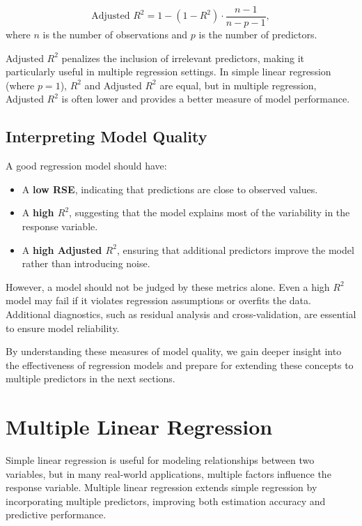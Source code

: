 \documentclass[
  11pt,
]{book}
\providecommand{\tightlist}{%
  \setlength{\itemsep}{0pt}\setlength{\parskip}{0pt}}
\theoremstyle{definition}
\theoremstyle{definition}
\theoremstyle{definition}
\theoremstyle{definition}
\theoremstyle{remark}
\begin{document}
\[
\text{Adjusted } R^2 = 1 - \left(1 - R^2\right) \cdot \frac{n-1}{n-p-1},
\]
where \(n\) is the number of observations and \(p\) is the number of predictors.

Adjusted \(R^2\) penalizes the inclusion of irrelevant predictors, making it particularly useful in multiple regression settings. In simple linear regression (where \(p = 1\)), \(R^2\) and Adjusted \(R^2\) are equal, but in multiple regression, Adjusted \(R^2\) is often lower and provides a better measure of model performance.

\subsection*{Interpreting Model Quality}\label{interpreting-model-quality}


A good regression model should have:

\begin{itemize}
\tightlist
\item
  A \textbf{low RSE}, indicating that predictions are close to observed values.\\
\item
  A \textbf{high \(R^2\)}, suggesting that the model explains most of the variability in the response variable.\\
\item
  A \textbf{high Adjusted \(R^2\)}, ensuring that additional predictors improve the model rather than introducing noise.
\end{itemize}

However, a model should not be judged by these metrics alone. Even a high \(R^2\) model may fail if it violates regression assumptions or overfits the data. Additional diagnostics, such as residual analysis and cross-validation, are essential to ensure model reliability.

By understanding these measures of model quality, we gain deeper insight into the effectiveness of regression models and prepare for extending these concepts to multiple predictors in the next sections.

\section{Multiple Linear Regression}\label{sec-multiple-regression}

Simple linear regression is useful for modeling relationships between two variables, but in many real-world applications, multiple factors influence the response variable. Multiple linear regression extends simple regression by incorporating multiple predictors, improving both estimation accuracy and predictive performance.
\end{document}
